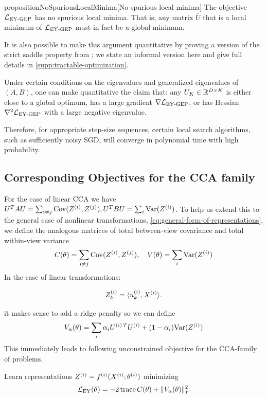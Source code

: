 \begin{restatable}{proposition}{NoSpuriousLocalMinima}[No spurious local minima]\label{prop:no-spurious}
The objective $\mathcal{L}_\text{EY-GEP}$ has no spurious local minima.
That is, any matrix $\bar{U}$ that is a local minimum of $\mathcal{L}_\text{EY-GEP}$ must in fact be a global minimum.
\end{restatable}

It is also possible to make this argument quantitative by proving a version of the strict saddle property from \cite{ge_no_2017,ge2015escaping}; we state an informal version here and give full details in \cref{supp:tractable-optimization}.

\begin{corollary}
    Under certain conditions on the eigenvalues and generalized eigenvalues of $(A,B)$, one can make quantitative the claim that:
    any $U_K \in \mathbb{R}^{D \times K}$ is either close to a global optimum, has a large gradient $\nabla \mathcal{L}_\text{EY-GEP}$, or has Hessian $\nabla^2 \mathcal{L}_\text{EY-GEP}$ with a large negative eigenvalue.

    Therefore, for appropriate step-size sequences, certain local search algorithms, such as sufficiently noisy SGD, will converge in polynomial time with high probability.
\end{corollary}

\subsection{Corresponding Objectives for the CCA family}
For the case of linear CCA we have $U^T A U = \sum_{i \neq j} \mathrm{Cov}(Z^{(i)}, Z^{(j)}), U^T B U = \sum_{i} \mathrm{Var}(Z^{(i)})$.
To help us extend this to the general case of nonlinear transformations, \cref{eq:general-form-of-representations}, we define the analogous matrices of total between-view covariance and total within-view variance
\begin{align}\label{eq:def-C-V-matrices}
\vphantom{\bigl(\bigr)} %
C(\theta) = \sum_{i \neq j} \Cov(Z\sps{i}, Z\sps{j}), \quad
V(\theta) = \sum_{i} \Var(Z\sps{i})
\end{align}
In the case of linear transformations:

\begin{equation}\label{eq:cca-linear-function-def}
Z^{(i)}_k = \langle u_k^{(i)} , X^{(i)} \rangle.
\end{equation}

it makes sense to add a ridge penalty so we can define
\begin{align}\label{eq:v-alpha-ridge-definition}
V_\alpha(\theta) = \sum_i \alpha_i {U^{(i)\,T}} U^{(i)} +  (1 - \alpha_i) \mathrm{Var}(Z^{(i)})
\end{align}
This immediately leads to following unconstrained objective for the CCA-family of problems.
\begin{definition}
    Learn representations $Z^{(i)} = f^{(i)}( X^{(i)}; \theta^{(i)})$ minimizing
    \begin{align}\label{eq:EY-loss-def-C-V}
    \mathcal{L}_\text{EY}(\theta) = - 2 \operatorname{trace} C(\theta) + \lVert V_\alpha(\theta)\rVert_F^2
    \end{align}
\end{definition}

